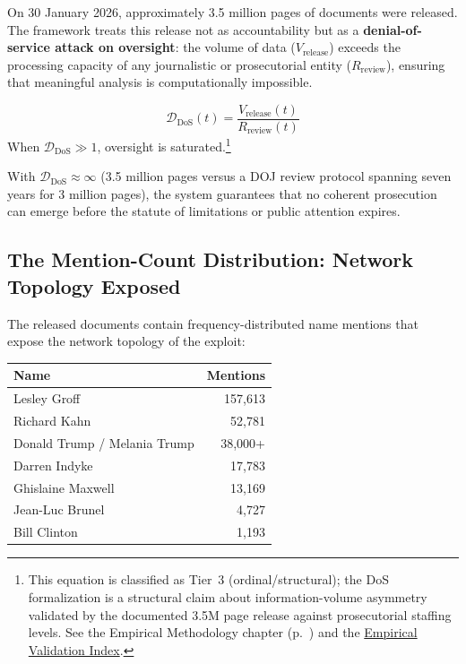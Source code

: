 On 30 January 2026, approximately 3.5 million pages of documents were released. The framework treats this release not as accountability but as a \textbf{denial-of-service attack on oversight}: the volume of data ($V_{\text{release}}$) exceeds the processing capacity of any journalistic or prosecutorial entity ($R_{\text{review}}$), ensuring that meaningful analysis is computationally impossible.

\begin{equation}\label{eq:gp9-dos-oversight}
\mathcal{D}_{\text{DoS}}(t) = \frac{V_{\text{release}}(t)}{R_{\text{review}}(t)}
\end{equation}
When $\mathcal{D}_{\text{DoS}} \gg 1$, oversight is saturated.\footnote{This equation is classified as Tier~3 (ordinal/structural); the DoS formalization is a structural claim about information-volume asymmetry validated by the documented 3.5M page release against prosecutorial staffing levels. See the Empirical Methodology chapter (p.~\pageref{ch:empirical_methodology}) and the \hyperref[app:empirical_index]{Empirical Validation Index}.}

With $\mathcal{D}_{\text{DoS}} \approx \infty$ (3.5 million pages versus a DOJ review protocol spanning seven years for 3 million pages), the system guarantees that no coherent prosecution can emerge before the statute of limitations or public attention expires.

\subsection{The Mention-Count Distribution: Network Topology Exposed}

The released documents contain frequency-distributed name mentions that expose the network topology of the exploit:

\begin{center}
\begin{tabular}{lr}
\toprule
\textbf{Name} & \textbf{Mentions} \\
\midrule
Lesley Groff & 157,613 \\
Richard Kahn & 52,781 \\
Donald Trump / Melania Trump & 38,000+ \\
Darren Indyke & 17,783 \\
Ghislaine Maxwell & 13,169 \\
Jean-Luc Brunel & 4,727 \\
Bill Clinton & 1,193 \\
\bottomrule
\end{tabular}
\end{center}

